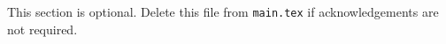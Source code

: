 \begin{acknowledgements}
This section is optional. Delete this file from \texttt{main.tex} if acknowledgements are not required.
\end{acknowledgements}
